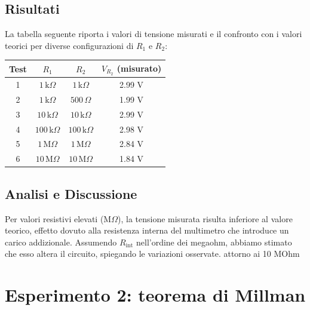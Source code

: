 \subsection{Risultati}

La tabella seguente riporta i valori di tensione misurati e il confronto con i valori teorici per diverse configurazioni di \( R_1 \) e \( R_2 \):

\begin{center}
\begin{tabular}{ c | c | c | c }

Test & $R_1$ & $R_2$ & $V_{R_2}$ (misurato) \\ 
\hline
1 & \(1 \, \text{k}\Omega\) & \(1 \, \text{k}\Omega\) & 2.99 V \\ 
\hline
2 & \(1 \, \text{k}\Omega\) & \(500 \, \Omega\) & 1.99 V \\
\hline
3 & \(10 \, \text{k}\Omega\) & \(10 \, \text{k}\Omega\) & 2.99 V \\
\hline
4 & \(100 \, \text{k}\Omega\) & \(100 \, \text{k}\Omega\) & 2.98 V \\
\hline
5 & \(1 \, \text{M}\Omega\) & \(1 \, \text{M}\Omega\) & 2.84 V \\
\hline
6 & \(10 \, \text{M}\Omega\) & \(10 \, \text{M}\Omega\) & 1.84 V \\

\end{tabular}
\end{center}

\subsection{Analisi e Discussione} 
Per valori resistivi elevati (\(\text{M}\Omega\)), la tensione misurata risulta inferiore al valore teorico, effetto dovuto alla resistenza interna del multimetro che introduce un carico addizionale. Assumendo \( R_{\text{int}} \) nell’ordine dei megaohm, abbiamo stimato che esso altera il circuito, spiegando le variazioni osservate.
attorno ai 10 MOhm


\newpage

\section{Esperimento 2: teorema di Millman}
